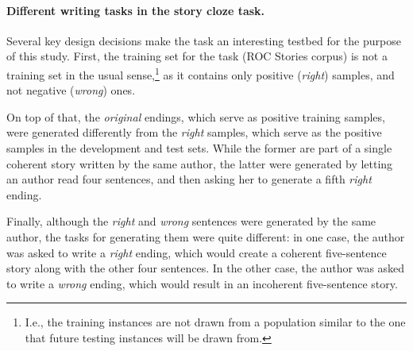 \documentclass[11pt,a4paper]{article}
\newcommand{\resolved}[1]{}
\newcommand{\roy}[1]{{\color{orange}\textsc{[#1 --rs]}}}
\newcommand{\yc}[1]{{\color{bblue}\{\textit{#1}\}$_{yc}$}}
\newcommand{\nascomment}[1]{{\color{blue}\textsc{[#1 --nas]}}}
\newcommand{\clinic}[1]{{\color{magenta}\textsc{[#1 --CLINIC]}}}
\renewcommand{\roy}[1]{{\color{orange}[#1 --rs]}}
\renewcommand{\roy}[1]{#1}
\renewcommand{\nascomment}[1]{}
\renewcommand{\yc}[1]{}
\begin{document}
\paragraph{Different writing tasks in the story cloze task.}
Several key design decisions make the task an interesting testbed for the purpose of this study.\resolved{\clinic{Which purpose?}}
First, the training set for the task (ROC Stories corpus) is not a
training set in the usual sense,\footnote{I.e., the training
  instances are not drawn from a population similar to the one that future
  testing instances will be drawn from.%
}  as it contains only positive ({\it right}) samples, and not negative ({\it wrong}) ones. 
 \resolved{\yc{As far as I understand, this was intentional --- they didn't want
  people to pick up on random superfluous cues that can inevidently
  get into the data creation process, exactly the kind that our work
  picks up. Given that, stating this can be viewed as
  misunderstanding, I'm afraid.} \nascomment{We should maybe say that
  they did this intentionally and concede that our approach goes
  against the intentions of their task design.  But a task that
  insists that systems avoid using features that might encode one kind
of information (like style) is absurd.  Alternately, we could reframe
this not as ``things weren't controlled for'' but instead stick to the
facts here and just describe what they did without judgment.}}

On top of that, the {\it original} endings, which serve as positive training samples, were generated differently from the {\it right} samples, which serve as the positive samples in the development and test sets. 
While the former are part of a single coherent story written by the same author, the latter were generated by letting an author read four sentences, 
and then asking her to generate a fifth {\it right} ending. 

Finally, although the {\it right} and {\it wrong} sentences were generated by the same author, 
the tasks for generating them were quite different: in one case, the author was asked to write a {\it right} ending, which would create a coherent five-sentence story along with the other four sentences. In the other case, the author was asked to write a {\it wrong} ending, which would result in an incoherent five-sentence story. 
 \resolved{In this work, we show that these differences are significant and
impose different writing styles on authors. \nascomment{this bit feels
  a little heavy and reptititive.}}
\end{document}
